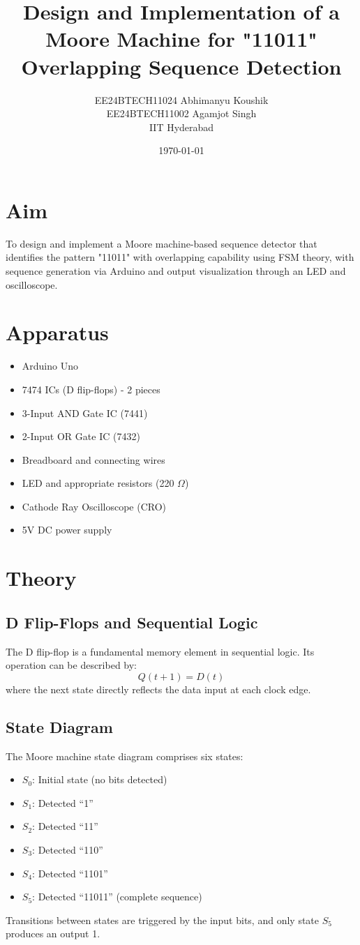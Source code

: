 \documentclass{article}
\title{Design and Implementation of a Moore Machine for "11011" Overlapping Sequence Detection}
\author{EE24BTECH11024 Abhimanyu Koushik\\EE24BTECH11002 Agamjot Singh\\IIT Hyderabad}
\date{\today}
\begin{document}
\maketitle

\section{Aim}
To design and implement a Moore machine-based sequence detector that identifies the pattern "11011" with overlapping capability using FSM theory, with sequence generation via Arduino and output visualization through an LED and oscilloscope.

\section{Apparatus}
\begin{itemize}
    \item Arduino Uno
    \item 7474 ICs (D flip-flops) - 2 pieces
    \item 3-Input AND Gate IC (7441)
    \item 2-Input OR Gate IC (7432)
    \item Breadboard and connecting wires
    \item LED and appropriate resistors (220 $\Omega$)
    \item Cathode Ray Oscilloscope (CRO)
    \item 5V DC power supply
\end{itemize}

\section{Theory}

\subsection{D Flip-Flops and Sequential Logic}
The D flip-flop is a fundamental memory element in sequential logic. Its operation can be described by:
\[
Q(t+1) = D(t)
\]
where the next state directly reflects the data input at each clock edge.

\subsection{State Diagram}
The Moore machine state diagram comprises six states:
\begin{itemize}
    \item \textbf{$S_0$}: Initial state (no bits detected)
    \item \textbf{$S_1$}: Detected ``1''
    \item \textbf{$S_2$}: Detected ``11''
    \item \textbf{$S_3$}: Detected ``110''
    \item \textbf{$S_4$}: Detected ``1101''
    \item \textbf{$S_5$}: Detected ``11011'' (complete sequence)
\end{itemize}
Transitions between states are triggered by the input bits, and only state $S_5$ produces an output 1.
\end{document}
